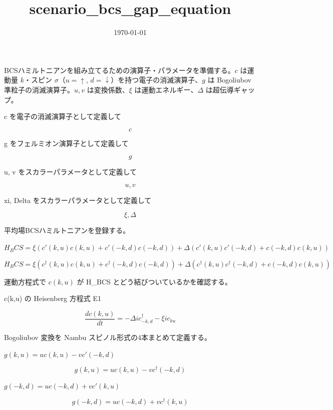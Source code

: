 \documentclass[dvipdfmx,a4paper,11pt]{jsarticle}
\title{scenario\_bcs\_gap\_equation}
\date{\today}
\begin{document}
\maketitle

BCSハミルトニアンを組み立てるための演算子・パラメータを準備する。$c$ は運動量 $k$・スピン $\sigma$（$u=\uparrow$, $d=\downarrow$）を持つ電子の消滅演算子、$g$ は Bogoliubov 準粒子の消滅演算子。$u, v$ は変換係数、$\xi$ は運動エネルギー、$\Delta$ は超伝導ギャップ。

c を電子の消滅演算子として定義して

\[
  c
\]

g をフェルミオン演算子として定義して

\[
  g
\]

u, v をスカラーパラメータとして定義して

\[
  u, v
\]

xi, Delta をスカラーパラメータとして定義して

\[
  \xi, \Delta
\]

平均場BCSハミルトニアンを登録する。

$H_BCS = \xi (c'(k,u) c(k,u) + c'(-k,d) c(-k,d)) + \Delta (c'(k,u) c'(-k,d) + c(-k,d) c(k,u))$

\begin{equation}
  H_BCS = \xi (c^{\dagger}(k,u) c(k,u) + c^{\dagger}(-k,d) c(-k,d)) + \Delta (c^{\dagger}(k,u) c^{\dagger}(-k,d) + c(-k,d) c(k,u))
  \label{eq:E1}
\end{equation}

運動方程式で $c(k,u)$ が H\_BCS とどう結びついているかを確認する。

c(k,u) の Heisenberg 方程式 E1

\begin{equation}
  \frac{d c(k,u)}{d t} = - \Delta \mathit{i} {c}_{-k,d}^{\dagger} - \xi \mathit{i} {c}_{ku}
  \label{eq:E2}
\end{equation}

Bogoliubov 変換を Nambu スピノル形式の4本まとめて定義する。

$g(k,u) = u c(k,u) - v c'(-k,d)$

\begin{equation}
  g(k,u) = u c(k,u) - v c^{\dagger}(-k,d)
  \label{eq:E3}
\end{equation}

$g(-k,d) = u c(-k,d) + v c'(k,u)$

\begin{equation}
  g(-k,d) = u c(-k,d) + v c^{\dagger}(k,u)
  \label{eq:E4}
\end{equation}
\end{document}
